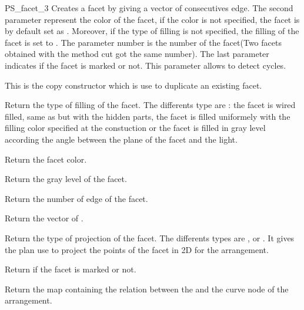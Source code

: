 \begin{ccClass} {PS_facet_3}
 {Creates a facet by giving a 
vector of consecutives  edge. The second parameter represent 
the color of the facet, if the color is not specified, the facet is by
default set as . 
Moreover, if the type of filling is not specified, the filling of the facet is
set to .
The parameter number is the number of the facet(Two facets obtained
with the method cut got the same number). The last parameter indicates 
if the facet is marked or not. This parameter allows to detect cycles.}

 {This is the copy
constructor which is use to duplicate an existing facet.}


\ccAccessFunctions

 {Return the type of filling of the 
facet. The differents type are :  the facet is wired filled,
 same as  but with the
hidden parts,  the facet is filled uniformely with
the filling color specified at the constuction or 
the facet is filled in gray level according the angle between the
plane of the facet and the light.}

 {Return the facet color.}

 {Return the gray level of 
the facet.}

 {Return the number of edge
of the facet.}

 {Return the 
vector of .}

 {Return the type of
projection of the facet. The differents types are  , 
or  . It gives the plan use to project the points of the facet 
in 2D for the arrangement.}

 {Return if the facet is marked
or not.}

 { Return
the map containing the relation between the  and the curve
node of the arrangement.}




\end{ccClass}
